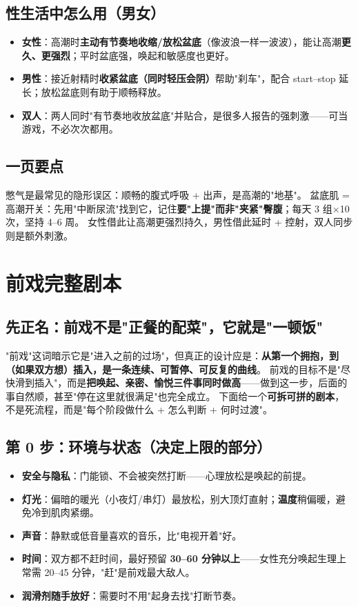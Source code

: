 \section{性生活中怎么用（男女）}
\begin{itemize}[leftmargin=2em,itemsep=0.3em]
  \item \textbf{女性}：高潮时\textbf{主动有节奏地收缩/放松盆底}（像波浪一样一波波），能让高潮\textbf{更久、更强烈}；平时盆底强，唤起和敏感度也更好。
  \item \textbf{男性}：接近射精时\textbf{收紧盆底（同时轻压会阴）}帮助"刹车"，配合 start--stop 延长；放松盆底则有助于顺畅释放。
  \item \textbf{双人}：两人同时"有节奏地收放盆底"并贴合，是很多人报告的强刺激——可当游戏，不必次次都用。
\end{itemize}

\section{一页要点}
憋气是最常见的隐形误区：顺畅的腹式呼吸 + 出声，是高潮的"地基"。
盆底肌 = 高潮开关：先用"中断尿流"找到它，记住\textbf{要"上提"而非"夹紧"臀腹}；每天 3 组×10 次，坚持 4--6 周。
女性借此让高潮更强烈持久，男性借此延时 + 控射，双人同步则是额外刺激。


\chapter{前戏完整剧本}

\section{先正名：前戏不是"正餐的配菜"，它就是"一顿饭"}
"前戏"这词暗示它是"进入之前的过场"，但真正的设计应是：\textbf{从第一个拥抱，到（如果双方想）插入，是一条连续、可暂停、可反复的曲线}。
前戏的目标不是"尽快滑到插入"，而是\textbf{把唤起、亲密、愉悦三件事同时做高}——做到这一步，后面的事自然顺，甚至"停在这里就很满足"也完全成立。
下面给一个\textbf{可拆可拼的剧本}，不是死流程，而是"每个阶段做什么 + 怎么判断 + 何时过渡"。

\section{第 0 步：环境与状态（决定上限的部分）}
\begin{itemize}[leftmargin=2em,itemsep=0.3em]
  \item \textbf{安全与隐私}：门能锁、不会被突然打断——心理放松是唤起的前提。
  \item \textbf{灯光}：偏暗的暖光（小夜灯/串灯）最放松，别大顶灯直射；\textbf{温度}稍偏暖，避免冷到肌肉紧绷。
  \item \textbf{声音}：静默或低音量喜欢的音乐，比"电视开着"好。
  \item \textbf{时间}：双方都不赶时间，最好预留 \textbf{30--60 分钟以上}——女性充分唤起生理上常需 20--45 分钟，"赶"是前戏最大敌人。
  \item \textbf{润滑剂随手放好}：需要时不用"起身去找"打断节奏。
\end{itemize}

